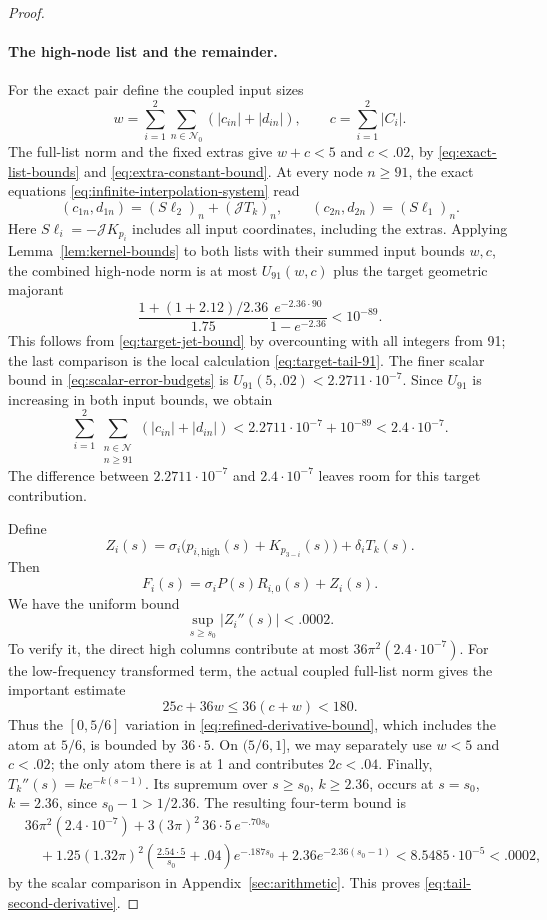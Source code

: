 \begin{proof}
\paragraph{The high-node list and the remainder.}
For the exact pair define the coupled input sizes
\[
 w=\sum_{i=1}^2\sum_{n\in\mathcal N_0}(|c_{in}|+|d_{in}|),\qquad
 c=\sum_{i=1}^2|C_i|.
\]
The full-list norm and the fixed extras give \(w+c<5\) and \(c<.02\), by
\eqref{eq:exact-list-bounds} and \eqref{eq:extra-constant-bound}.  At every
node \(n\ge91\), the exact equations
\eqref{eq:infinite-interpolation-system} read
\[
 (c_{1n},d_{1n})=(S\ell_2)_n+(\mathcal JT_k)_n,
 \qquad
 (c_{2n},d_{2n})=(S\ell_1)_n.
\]
Here \(S\ell_i=-\mathcal JK_{p_i}\) includes all input coordinates,
including the extras.  Applying Lemma~\ref{lem:kernel-bounds} to both lists
with their summed input bounds \(w,c\), the combined high-node norm is at
most \(U_{91}(w,c)\) plus the target geometric majorant
\[
 \frac{1+(1+2.12)/2.36}{1.75}
       \frac{e^{-2.36\cdot90}}{1-e^{-2.36}}<10^{-89}.
\]
This follows from \eqref{eq:target-jet-bound} by overcounting with all integers
from 91; the last comparison is the local calculation
\eqref{eq:target-tail-91}.  The finer scalar bound in
\eqref{eq:scalar-error-budgets} is \(U_{91}(5,.02)<2.2711\cdot10^{-7}\).
Since \(U_{91}\) is increasing in both input bounds, we obtain
\[
 \sum_{i=1}^2\sum_{\substack{n\in\mathcal N\\n\ge91}}
       (|c_{in}|+|d_{in}|)
 <2.2711\cdot10^{-7}+10^{-89}<2.4\cdot10^{-7}.
\]
The difference between \(2.2711\cdot10^{-7}\) and
\(2.4\cdot10^{-7}\) leaves room for this target contribution.

Define
\[
 Z_i(s)=\sigma_i\bigl(p_{i,\mathrm{high}}(s)+K_{p_{3-i}}(s)\bigr)
                  +\delta_iT_k(s).
\]
Then
\begin{equation}\label{eq:tail-decomposition}
 F_i(s)=\sigma_iP(s)R_{i,0}(s)+Z_i(s).
\end{equation}
We have the uniform bound
\begin{equation}\label{eq:tail-second-derivative}
 \sup_{s\ge s_0}|Z_i''(s)|<.0002.
\end{equation}
To verify it, the direct high columns contribute at most
\(36\pi^2(2.4\cdot10^{-7})\).  For the low-frequency transformed term, the
actual coupled full-list norm gives the important estimate
\[
 25c+36w\le36(c+w)<180.
\]
Thus the \([0,5/6]\) variation in \eqref{eq:refined-derivative-bound}, which
includes the atom at \(5/6\), is bounded by \(36\cdot5\).  On \((5/6,1]\),
we may separately use \(w<5\) and \(c<.02\); the only atom there is at 1 and
contributes \(2c<.04\).  Finally, \(T_k''(s)=k e^{-k(s-1)}\).  Its supremum
over \(s\ge s_0\), \(k\ge2.36\), occurs at \(s=s_0\), \(k=2.36\), since
\(s_0-1>1/2.36\).  The resulting four-term bound is
\begin{align*}
 &36\pi^2(2.4\cdot10^{-7})
  +3(3\pi)^2\,36\cdot5\,e^{-.70s_0}\\
 &\quad+1.25(1.32\pi)^2
       \left(\frac{2.54\cdot5}{s_0}+.04\right)e^{-.187s_0}
  +2.36e^{-2.36(s_0-1)}
 <8.5485\cdot10^{-5}<.0002,
\end{align*}
by the scalar comparison in Appendix~\ref{sec:arithmetic}.  This proves
\eqref{eq:tail-second-derivative}.


\end{proof}
